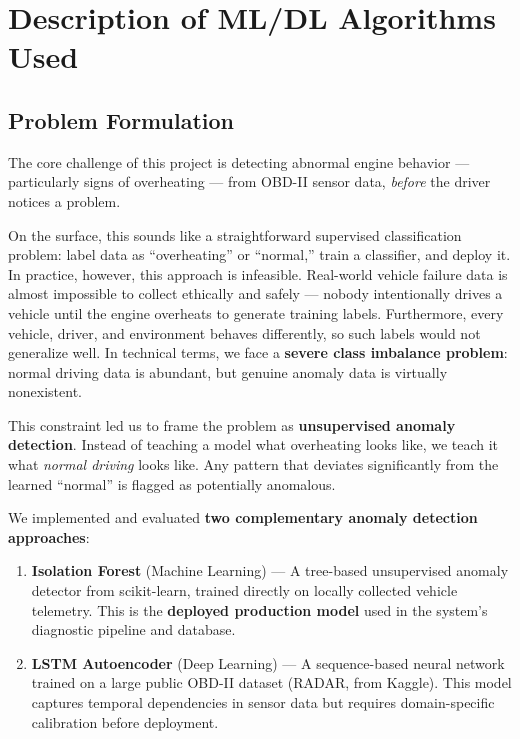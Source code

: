 \chapter{Description of ML/DL Algorithms Used}

\section{Problem Formulation}

The core challenge of this project is detecting abnormal engine behavior --- particularly signs of overheating --- from OBD-II sensor data, \textit{before} the driver notices a problem.

On the surface, this sounds like a straightforward supervised classification problem: label data as ``overheating'' or ``normal,'' train a classifier, and deploy it. In practice, however, this approach is infeasible. Real-world vehicle failure data is almost impossible to collect ethically and safely --- nobody intentionally drives a vehicle until the engine overheats to generate training labels. Furthermore, every vehicle, driver, and environment behaves differently, so such labels would not generalize well. In technical terms, we face a \textbf{severe class imbalance problem}: normal driving data is abundant, but genuine anomaly data is virtually nonexistent.

This constraint led us to frame the problem as \textbf{unsupervised anomaly detection}. Instead of teaching a model what overheating looks like, we teach it what \textit{normal driving} looks like. Any pattern that deviates significantly from the learned ``normal'' is flagged as potentially anomalous.

We implemented and evaluated \textbf{two complementary anomaly detection approaches}:

\begin{enumerate}
    \item \textbf{Isolation Forest} (Machine Learning) --- A tree-based unsupervised anomaly detector from scikit-learn, trained directly on locally collected vehicle telemetry. This is the \textbf{deployed production model} used in the system's diagnostic pipeline and database.

    \item \textbf{LSTM Autoencoder} (Deep Learning) --- A sequence-based neural network trained on a large public OBD-II dataset (RADAR, from Kaggle). This model captures temporal dependencies in sensor data but requires domain-specific calibration before deployment.
\end{enumerate}

